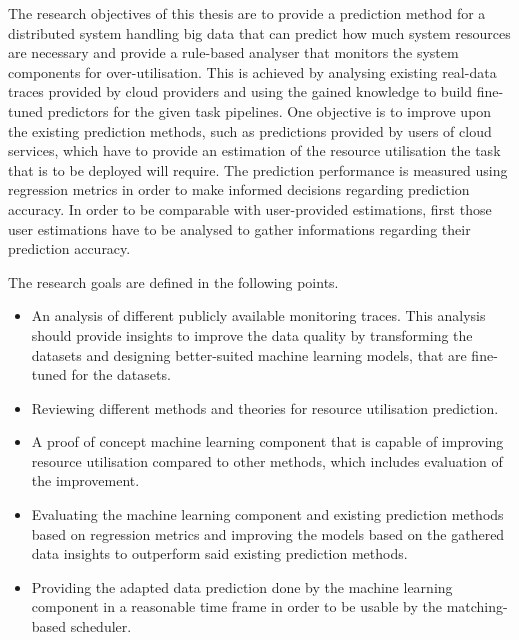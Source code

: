             The research objectives of this thesis are to provide a prediction method for a distributed system handling big data that can predict how much system resources are necessary and provide a rule-based analyser that monitors the system components for over-utilisation.
            This is achieved by analysing existing real-data traces provided by cloud providers and using the gained knowledge to build fine-tuned predictors for the given task pipelines. One objective is to improve upon the existing prediction methods, such as predictions provided by users of cloud services, which have to provide an estimation of the resource utilisation the task that is to be deployed will require. 
            The prediction performance is measured using regression metrics in order to make informed decisions regarding prediction accuracy.
            In order to be comparable with user-provided estimations, first those user estimations have to be analysed to gather informations regarding their prediction accuracy.

            The research goals are defined in the following points.

            \begin{itemize}
                \item An analysis of different publicly available monitoring traces. This analysis should provide insights to improve the data quality by transforming the datasets and designing better-suited machine learning models, that are fine-tuned for the datasets.
                
                \item Reviewing different methods and theories for resource utilisation prediction. 
                \item A proof of concept machine learning component that is capable of improving resource utilisation compared to other methods, which includes evaluation of the improvement. 
                \item Evaluating the machine learning component and existing prediction methods based on regression metrics and improving the models based on the gathered data insights to outperform said existing prediction methods.
                \item Providing the adapted data prediction done by the machine learning component in a reasonable time frame in order to be usable by the matching-based scheduler. 
                
            \end{itemize}
        
